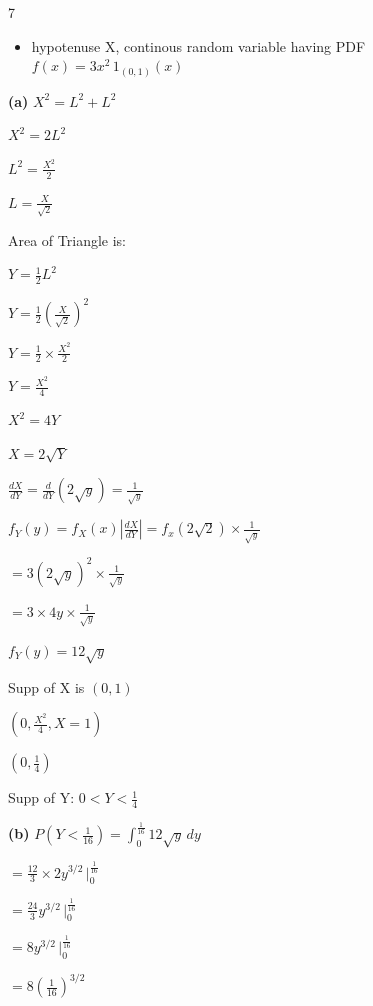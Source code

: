 \documentclass[12 pt]{article}
\begin{document}
    \begin{exercise}{7}
    \hfill

    \begin{itemize}
        \item hypotenuse X, continous random variable having PDF $f(x) = 3x^2 \, 1_{(0,1)} (x)$
    \end{itemize}

    \textbf{(a)} $X^2 = L^2 + L^2$

    $X^2 = 2 L^2$

    $L^2 = \frac{X^2}{2}$

    $L = \frac{X}{\sqrt{2}}$

    Area of Triangle is:

    $Y = \frac{1}{2} L^2$

    $Y = \frac{1}{2} (\frac{X}{\sqrt{2}})^2$

    $Y = \frac{1}{2} \times \frac{X^2}{2}$

    $Y = \frac{X^2}{4}$

    $X^2 = 4Y$

    $X = 2 \sqrt{Y}$

    \hfill

    $\frac{dX}{dY} = \frac{d}{dY} (2 \sqrt{y}) = \frac{1}{\sqrt{y}}$

    $f_Y(y) = f_X(x) |\frac{dX}{dY}| = f_x(2 \sqrt{2}) \times \frac{1}{\sqrt{y}}$

    $= 3(2 \sqrt{y})^2 \times \frac{1}{\sqrt{y}}$

    $= 3 \times 4 y \times \frac{1}{\sqrt{y}}$

    \hfill

    $f_Y(y) = 12 \sqrt{y}$

    Supp of X is $(0, 1)$

    $(0, \frac{X^2}{4}, X= 1)$

    $(0, \frac{1}{4})$

    \hfill

    Supp of Y: $0 < Y < \frac{1}{4}$

    \hfill

    \textbf{(b)} $P(Y < \frac{1}{16}) = \int_{0}^{\frac{1}{16}} 12 \sqrt{y} \, dy$

    $= \frac{12}{3} \times 2 y^{3/2} \, |_{0}^{\frac{1}{16}}$

    $= \frac{24}{3} y^{3/2} \, |_{0}^{\frac{1}{16}}$

    $= 8 y^{3/2} \, |_{0}^{\frac{1}{16}}$

    $= 8 (\frac{1}{16})^{3/2}$


\end{exercise}
\end{document}
